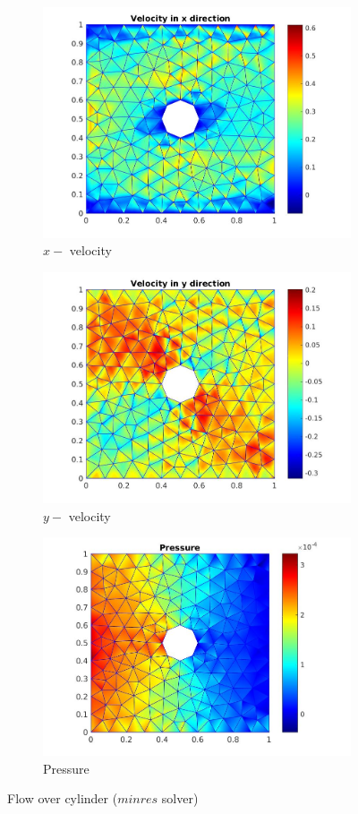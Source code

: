 \documentclass[a4paper,openany]{book}
\begin{document}
\begin{figure}
\begin{subfigure}{\textwidth}	
  \includegraphics[width=0.8\linewidth]{cylinder_minres_vx.jpg}
    \caption{$x-$ velocity}
    \label{x_vel_stoke_minres}
\end{subfigure}
\begin{subfigure}{\textwidth}	
    \includegraphics[width=0.8\linewidth]{cylinder_minres_vy.jpg}
    \caption{$y-$ velocity}
     \label{y_vel_stoke_minres}
\end{subfigure}
\begin{subfigure}{\textwidth}	
    \includegraphics[width=0.8\linewidth]{cylinder_minres_pressure.jpg}
    \caption{Pressure}
      \label{pressure_stoke_minres}
\end{subfigure}
\caption{Flow over cylinder ($minres$ solver)}
\label{flow_over_cylinder_minres}
\end{figure}
\end{document}
